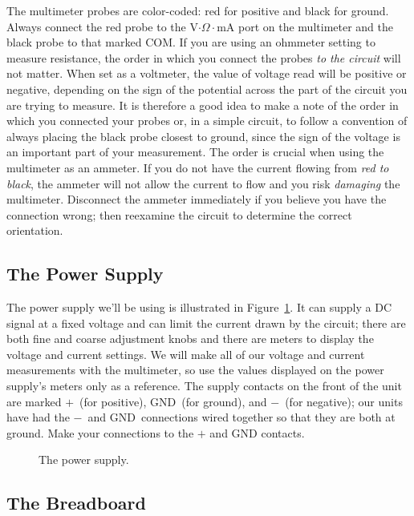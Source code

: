The multimeter probes are color-coded: red for positive and black for ground.
Always connect the red probe to the V$\cdot\Omega\cdot$mA port on the 
multimeter and the black probe to that marked COM. If you are using an 
ohmmeter setting to measure resistance, the order in which you connect the 
probes {\it to the circuit} will not matter.  When set as a voltmeter, the 
value of voltage read will be positive or negative, depending on the sign of 
the potential across the part of the circuit you are trying to measure.  It is 
therefore a good idea to make a note of the order in which you connected your 
probes or, in a simple circuit, to follow a convention of always placing the 
black probe closest to ground, since the sign of the voltage is an important 
part of your measurement.  The order is crucial when using the multimeter as 
an ammeter.  If you do not have the current flowing from {\it red to black}, 
the ammeter will not allow the current to flow and you risk {\it damaging} the 
multimeter. Disconnect the ammeter immediately if you believe you have the 
connection wrong; then reexamine the circuit to determine the correct 
orientation. 

\subsection{The Power Supply}
 
The power supply we'll be using is illustrated in 
Figure~\ref{fig:DC:powersupply}.
It can supply a DC signal at a fixed voltage and can limit the current drawn
by the circuit; there are both fine and coarse adjustment knobs and there are
meters to display the voltage and current settings.  We will make all of our 
voltage and current measurements with the multimeter, so use the values 
displayed on the power supply's meters only as a reference.  The supply 
contacts on the front of the unit are marked $+$~(for positive), GND~(for 
ground), and $-$~(for negative); our units have had the $-$~and 
GND~connections wired together so that they are both at ground. Make your 
connections to the $+$ and GND contacts. 
\begin{figure}
\centerline{\epsfxsize=8cm } 
\caption{The power supply.}
\label{fig:DC:powersupply}
\end{figure}

\subsection{The Breadboard}


